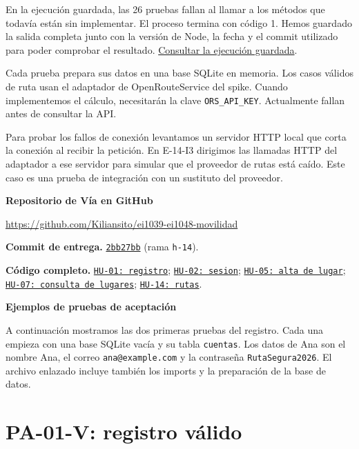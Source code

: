 \documentclass[10pt,a4paper]{article}
\newcommand{\codigo}[2]{\href{https://github.com/Kiliansito/ei1039-ei1048-movilidad/blob/690589d1720a82e6f1e3c92eddd7acc4274bda91/#1}{\texttt{\small #2}}}
\begin{document}
En la ejecución guardada, las 26 pruebas fallan al llamar a los métodos que todavía están sin implementar. El proceso termina con código 1. Hemos guardado la salida completa junto con la versión de Node, la fecha y el commit utilizado para poder comprobar el resultado. \href{https://github.com/Kiliansito/ei1039-ei1048-movilidad/blob/h-14/docs/entrega2/evidencias/pruebas-it01-rojo.txt}{Consultar la ejecución guardada}.

Cada prueba prepara sus datos en una base SQLite en memoria. Los casos válidos de ruta usan el adaptador de OpenRouteService del spike. Cuando implementemos el cálculo, necesitarán la clave \texttt{ORS\_API\_KEY}. Actualmente fallan antes de consultar la API.

Para probar los fallos de conexión levantamos un servidor HTTP local que corta la conexión al recibir la petición. En E-14-I3 dirigimos las llamadas HTTP del adaptador a ese servidor para simular que el proveedor de rutas está caído. Este caso es una prueba de integración con un sustituto del proveedor.

\textbf{Repositorio de Vía en GitHub}\par
\url{https://github.com/Kiliansito/ei1039-ei1048-movilidad}

\textbf{Commit de entrega.} \href{https://github.com/Kiliansito/ei1039-ei1048-movilidad/commit/2bb27bb3dfb6a1a910ce6df1e172908a8fbdfe14}{\texttt{2bb27bb}} (rama \texttt{h-14}).

\textbf{Código completo.}
\codigo{tests/registro.aceptacion.test.ts}{HU-01: registro};
\codigo{tests/inicio-sesion.aceptacion.test.ts}{HU-02: sesion};
\codigo{tests/guardar-lugar.aceptacion.test.ts}{HU-05: alta de lugar};
\codigo{tests/consultar-lugares.aceptacion.test.ts}{HU-07: consulta de lugares};
\codigo{tests/calcular-ruta.aceptacion.test.ts}{HU-14: rutas}.

\newpage
{\LARGE\bfseries Ejemplos de pruebas de aceptación}\par
A continuación mostramos las dos primeras pruebas del registro. Cada una empieza con una base SQLite vacía y su tabla \texttt{cuentas}. Los datos de Ana son el nombre Ana, el correo \texttt{ana@example.com} y la contraseña \texttt{RutaSegura2026}. El archivo enlazado incluye también los imports y la preparación de la base de datos.

\section*{PA-01-V: registro válido}

\end{document}
